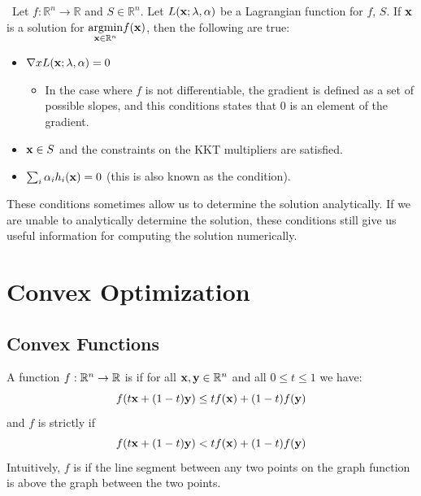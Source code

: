 \begin{theorem}\label{Karush-Kahn-Tucker Conditions}\
Let $f:\mathbb{R}^n \to \mathbb{R}$ and $S\in\mathbb{R}^n$. Let $L(\vx;\vlambda,\valpha)$ be a Lagrangian function for $f$, $S$. If $\vx$ is a solution for $\underset{\vx\in\mathbb{R}^n}{\argmin} f(\vx)$, then the following are true:
    \begin{itemize}
        \item $\nabla{x} L(\vx;\vlambda,\valpha) = 0$
        \begin{itemize}
            \item In the case where $f$ is not differentiable, the gradient is defined as a set of possible slopes, and this conditions states that $0$ is an element of the gradient.
        \end{itemize}
        \item $\vx \in S$ and the constraints on the KKT multipliers are satisfied.
        \item $\sum_{i} \alpha_{i} h_{i}(\vx)=0$ (this is also known as the  condition).
        \end{itemize}
\end{theorem}

These conditions sometimes allow us to determine the solution analytically. If we are unable to analytically determine the solution, these conditions still give us useful information for computing the solution numerically. 

\section{Convex Optimization} 


\subsection{Convex Functions}
\label{convex-functions}
\begin{definition}
    \label{def-convexity}
    A function $f : \R^n \rightarrow \R$ is  if for all $\vx, \vy \in \R^n$ and all $0 \leq t \leq 1$ we have:
    $$f(t\vx + (1-t)\vy) \leq tf(\vx) + (1-t)f(\vy)$$
    and $f$ is strictly \cvx{} if
    $$f(t\vx + (1-t)\vy) < tf(\vx) + (1-t)f(\vy)$$
    Intuitively, $f$ is  if the line segment between any two points on the graph function is above the graph between the two points.
\end{definition}

